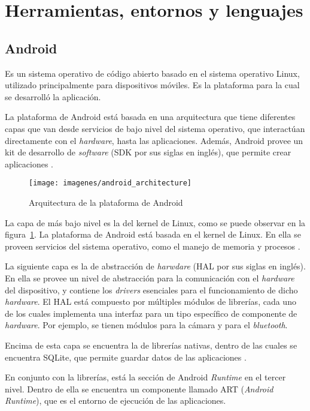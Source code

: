 \section{Herramientas, entornos y lenguajes} \label{Herramientas, entornos y lenguajes}


\subsection{Android}
Es un sistema operativo de código abierto basado en el sistema operativo Linux, utilizado principalmente para dispositivos móviles\cite{AND1}. Es la plataforma para la cual se desarrolló la aplicación. 

La plataforma de Android está basada en una arquitectura que tiene diferentes capas que van desde servicios de bajo nivel del sistema operativo, que interactúan directamente con el \textit{hardware}, hasta las aplicaciones. Además, Android provee un kit de desarrollo de \textit{software} (SDK por sus siglas en inglés), que permite crear aplicaciones \cite{AND3}.

\begin{figure}[ht]
  \centering
  \texttt{[image: imagenes/android\_architecture]}
  \caption{Arquitectura de la plataforma de Android}
  \label{fig:arquitecturaAndroid}
\end{figure}

La capa de más bajo nivel es la del kernel de Linux, como se puede observar en la figura~\ref{fig:arquitecturaAndroid}. La plataforma de Android está basada en el kernel de Linux. En ella se proveen servicios del sistema operativo, como el manejo de memoria y procesos \cite{AND3}.

La siguiente capa es la de abstracción de \textit{harwdare} (HAL por sus siglas en inglés). En ella se provee un nivel de abstracción para la comunicación con el \textit{hardware} del dispositivo, y contiene los \textit{drivers} esenciales para el funcionamiento de dicho \textit{hardware}. El HAL está compuesto por múltiples módulos de librerías, cada uno de los cuales implementa una interfaz para un tipo específico de componente de \textit{hardware}. Por ejemplo, se tienen módulos para la cámara y para el \textit{bluetooth}.

Encima de esta capa se encuentra la de librerías nativas, dentro de las cuales se encuentra SQLite, que permite guardar datos de las aplicaciones \cite{AND3}.

En conjunto con la librerías, está la sección de Android \textit{Runtime} en el tercer nivel. Dentro de ella se encuentra un componente llamado ART (\textit{Android Runtime}), que es el entorno de ejecución de las aplicaciones\cite{AND3}.

